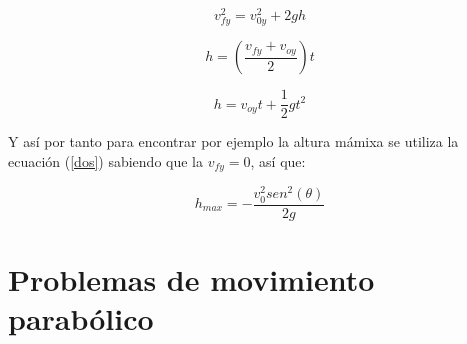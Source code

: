 \begin{equation}
 v_{fy}^2 = v_{0y}^2 + 2gh
\end{equation}\label{dos}

\begin{equation}
 h =(\frac{v_{fy}+v_{oy}}{2})t
\end{equation}

\begin{equation}
 h = v_{oy}t + \frac{1}{2}gt^2
\end{equation}

Y así por tanto para encontrar por ejemplo la altura mámixa se utiliza la ecuación (\ref{dos}) sabiendo que la $v_{fy} = 0$, así 
que:

\begin{equation}
 h_{max} = -\frac{v_0^2sen^2(\theta)}{2g}
\end{equation}

\section{Problemas de movimiento parabólico}

